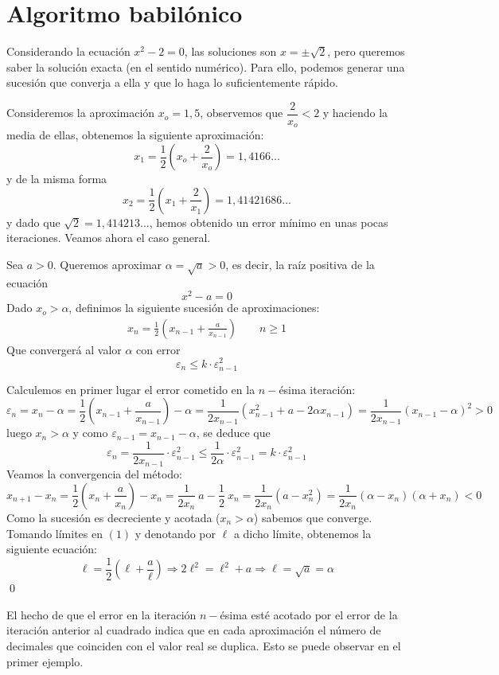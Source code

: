     \section{Algoritmo babilónico}
    \begin{ejem}
    
    Considerando la ecuación $x^2-2=0$, las soluciones son $x=\pm \sqrt{2}$, pero queremos saber la solución exacta (en el sentido numérico). Para ello, podemos generar una sucesión que converja a ella y que lo haga lo suficientemente rápido. 

    Consideremos la aproximación $x_o=1,5$, observemos que $\dfrac{2}{x_o}< 2$ y haciendo la media de ellas, obtenemos la siguiente aproximación:
    $$x_1=\dfrac{1}{2}\left(x_o+\dfrac{2}{x_o}\right)=1,4166...$$
    y de la misma forma
    $$x_2=\dfrac{1}{2}\left(x_1+\dfrac{2}{x_1}\right)=1,41421686...$$
    y dado que $\sqrt{2}=1,414213...$, hemos obtenido un error mínimo en unas pocas iteraciones. Veamos ahora el caso general.
    \end{ejem}
    \begin{met}
    Sea $a>0$. Queremos aproximar $\alpha=\sqrt{a}>0$, es decir, la raíz positiva de la ecuación
    $$x^2-a=0$$
    Dado $x_o>\alpha$, definimos la siguiente sucesión de aproximaciones:
    \begin{align}
    x_n=\frac{1}{2}\left(x_{n-1}+\frac{a}{x_{n-1}}\right)\qquad n\geq 1
    \end{align}
    Que convergerá al valor $\alpha$ con error 
    $$\varepsilon_{n}\leq k \cdot \varepsilon_{n-1}^2$$
    \end{met}
    \begin{dem}
    Calculemos en primer lugar el error cometido en la $n-$ésima iteración:
    $$\varepsilon_n=x_n-\alpha=\frac{1}{2}\left(x_{n-1}+\frac{a}{x_{n-1}}\right)-\alpha=\frac{1}{2x_{n-1}}(x_{n-1}^2+a-2\alpha x_{n-1})=\frac{1}{2x_{n-1}}(x_{n-1}-\alpha)^2>0$$
    luego $x_n>\alpha$ y como $\varepsilon_{n-1}=x_{n-1}-\alpha$, se deduce que
    $$\varepsilon_n=\frac{1}{2x_{n-1}}\cdot \varepsilon_{n-1}^2\leq \frac{1}{2\alpha}\cdot \varepsilon_{n-1}^2=k\cdot \varepsilon_{n-1}^2$$
    Veamos la convergencia del método:
    $$x_{n+1}-x_n=\frac{1}{2}\left(x_n+\frac{a}{x_n}\right)-x_n=\frac{1}{2x_n} \: a-\frac{1}{2} \: x_n=\frac{1}{2x_n}(a-x_n^2)=\frac{1}{2x_n}(\alpha-x_n)(\alpha+x_n)<0$$
    Como la sucesión es decreciente y acotada ($x_n>\alpha$) sabemos que converge. Tomando límites en $(1)$ y denotando por $\ell$ a dicho límite, obtenemos la siguiente ecuación:
    $$\ell=\frac{1}{2}\left(\ell+\frac{a}{\ell}\right)\Longrightarrow 2\ell^2=\ell^2+a\Longrightarrow \ell=\sqrt{a}=\alpha$$
    \qed\end{dem} 
    \begin{obs}
    El hecho de que el error en la iteración $n-$ésima esté acotado por el error de la iteración anterior al cuadrado indica que en cada aproximación el número de decimales que coinciden con el valor real se duplica. Esto se puede observar en el primer ejemplo.
    \end{obs}
